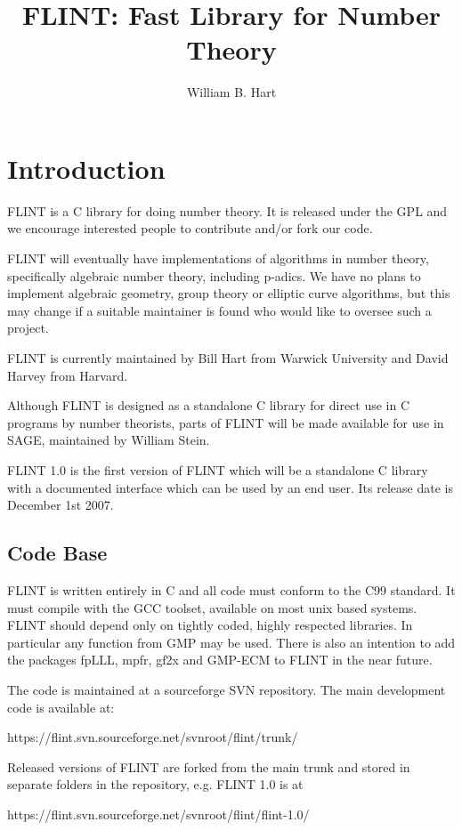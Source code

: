 \documentclass[a4paper,10pt]{article}
\title{FLINT: Fast Library for Number Theory}
\author{William B. Hart}
\begin{document}
\maketitle
\lstset{language=c}
\lstset{escapeinside=\%\%}

\section{Introduction}
FLINT is a C library for doing number theory. It is released under the GPL and we encourage interested people to contribute and/or fork our code.

FLINT will eventually have implementations of algorithms in number theory, specifically algebraic number theory, including p-adics. We have no plans to implement algebraic geometry, group theory or elliptic curve algorithms, but this may change if a suitable maintainer is found who would like to oversee such a project.

FLINT is currently maintained by Bill Hart from Warwick University and David Harvey from Harvard.

Although FLINT is designed as a standalone C library for direct use in C programs by number theorists, parts of FLINT will be made available for use in SAGE, maintained by William Stein. 

FLINT 1.0 is the first version of FLINT which will be a standalone C library with a documented interface which can be used by an end user. Its release date is December 1st 2007. 

\subsection{Code Base}
FLINT is written entirely in C and all code must conform to the C99 standard. It must compile with the GCC toolset, available on most unix based systems. FLINT should depend only on tightly coded, highly respected libraries. In particular any function from GMP may be used. There is also an intention to add the packages fpLLL, mpfr, gf2x and GMP-ECM to FLINT in the near future.

The code is maintained at a sourceforge SVN repository. The main development code is available at:

https://flint.svn.sourceforge.net/svnroot/flint/trunk/

Released versions of FLINT are forked from the main trunk and stored in separate folders in the repository, e.g. FLINT 1.0 is at

https://flint.svn.sourceforge.net/svnroot/flint/flint-1.0/
\end{document}
